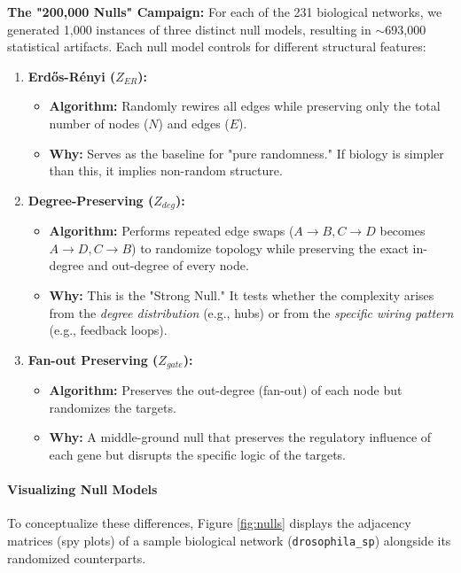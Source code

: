 \textbf{The "200,000 Nulls" Campaign:}
For each of the 231 biological networks, we generated 1,000 instances of three distinct null models, resulting in $\sim$693,000 statistical artifacts. Each null model controls for different structural features:

\begin{enumerate}
    \item \textbf{Erdős-Rényi ($Z_{ER}$):} 
    \begin{itemize}
        \item \textbf{Algorithm:} Randomly rewires all edges while preserving only the total number of nodes ($N$) and edges ($E$).
        \item \textbf{Why:} Serves as the baseline for "pure randomness." If biology is simpler than this, it implies non-random structure.
    \end{itemize}
    
    \item \textbf{Degree-Preserving ($Z_{deg}$):}
    \begin{itemize}
        \item \textbf{Algorithm:} Performs repeated edge swaps ($A \to B, C \to D$ becomes $A \to D, C \to B$) to randomize topology while preserving the exact in-degree and out-degree of every node.
        \item \textbf{Why:} This is the "Strong Null." It tests whether the complexity arises from the \textit{degree distribution} (e.g., hubs) or from the \textit{specific wiring pattern} (e.g., feedback loops).
    \end{itemize}

    \item \textbf{Fan-out Preserving ($Z_{gate}$):}
    \begin{itemize}
        \item \textbf{Algorithm:} Preserves the out-degree (fan-out) of each node but randomizes the targets.
        \item \textbf{Why:} A middle-ground null that preserves the regulatory influence of each gene but disrupts the specific logic of the targets.
    \end{itemize}
\end{enumerate}

\paragraph{Visualizing Null Models}
To conceptualize these differences, Figure \ref{fig:nulls} displays the adjacency matrices (spy plots) of a sample biological network (\texttt{drosophila\_sp}) alongside its randomized counterparts.

